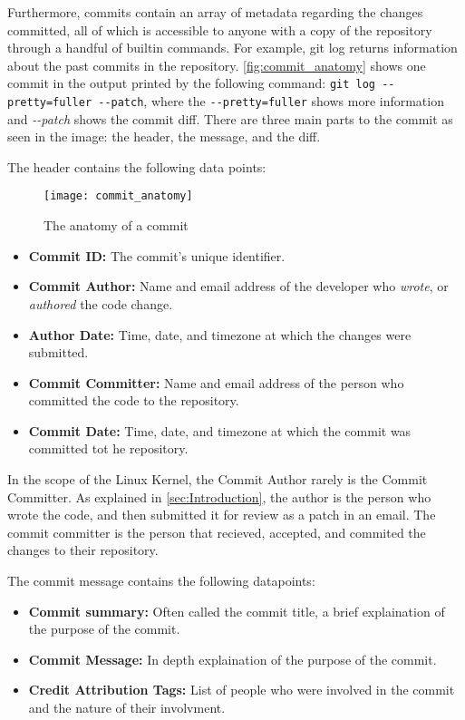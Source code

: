 Furthermore, commits contain an array of metadata regarding the changes committed, all of which is accessible to anyone with a copy of the repository through a handful of builtin commands. For example, git log returns information about the past commits in the repository. \autoref{fig:commit_anatomy} shows one commit in the output printed by the following command: \texttt{git log -{}-pretty=fuller -{}-patch}, where the \texttt{-{}-pretty=fuller} shows more information and \textit{-{}-patch} shows the commit diff. There are three main parts to the commit as seen in the image: the header, the  message, and the diff.

The header contains the following data points:

\begin{figure}[htb]
\centering
\texttt{[image: commit\_anatomy]}
\caption{The anatomy of a commit}
\label{fig:commit_anatomy}
\end{figure}

\begin{itemize}
	\item \textbf{Commit ID:} The commit's unique identifier.
	\item \textbf{Commit Author:} Name and email address of the developer who \textit{wrote}, or \textit{authored} the code change.
	\item \textbf{Author Date:} Time, date, and timezone at which the changes were submitted.
	\item \textbf{Commit Committer:} Name and email address of the person who committed the code to the repository.
	\item \textbf{Commit Date:} Time, date, and timezone at which the commit was committed tot he repository.
\end{itemize}

In the scope of the Linux Kernel, the Commit Author rarely is the Commit Committer. As explained in \autoref{sec:Introduction}, the author is the person who wrote the code, and then submitted it for review as a patch in an email. The commit committer is the person that recieved, accepted, and commited the changes to their repository.

The commit message contains the following datapoints:

\begin{itemize}
	\item \textbf{Commit summary:} Often called the commit title, a brief explaination of the purpose of the commit. 
	\item \textbf{Commit Message:} In depth explaination of the purpose of the commit.
	\item \textbf{Credit Attribution Tags:} List of people who were involved in the commit and the nature of their involvment. 
\end{itemize}

